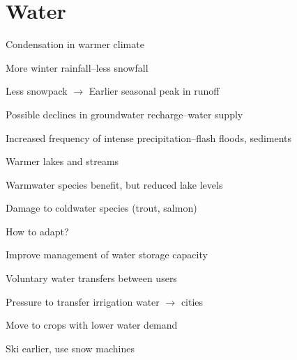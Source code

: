 \documentclass[12pt]{article}
\begin{document}
\section[Water]{Water}
\begin{itemize*}
\item Condensation in warmer climate
\begin{itemize*}
\item More winter rainfall--less snowfall
\item Less snowpack $\rightarrow$ Earlier seasonal peak in runoff
\item Possible declines in groundwater recharge--water supply
\item Increased frequency of intense precipitation--flash floods, sediments
\end{itemize*}
\item Warmer lakes and streams
\begin{itemize*}
\item Warmwater species benefit, but reduced lake levels
\item Damage to coldwater species (trout, salmon)
\end{itemize*}
\item How to adapt?
\begin{itemize*}
\item Improve management of water storage capacity
\item Voluntary water transfers between users
\item Pressure to transfer irrigation water $\rightarrow$ cities
\item Move to crops with lower water demand
\item Ski earlier, use snow machines
\end{itemize*}
\end{itemize*}
\vfill
\end{document}
